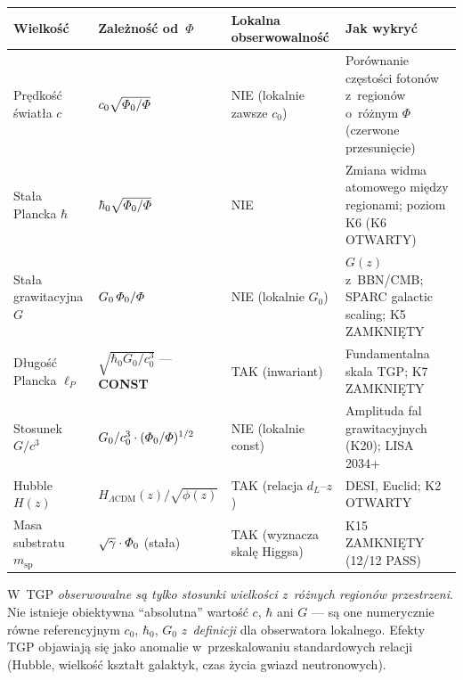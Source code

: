 \begin{center}
\small
\begin{tabular}{@{}p{3.2cm}p{2.8cm}p{2.5cm}p{5.5cm}@{}}
\toprule
\textbf{Wielko\'s\'c} & \textbf{Zale\.zno\'s\'c od~$\Phi$}
  & \textbf{Lokalna obserwowalno\'s\'c}
  & \textbf{Jak wykry\'c} \\
\midrule
Pr\k{e}dko\'s\'c \'swiat\l{}a $c$
  & $c_0\sqrt{\varPhi_0/\varPhi}$
  & NIE (lokalnie zawsze $c_0$)
  & Por\'ownanie cz\k{e}sto\'sci foton\'ow z~region\'ow
    o~r\'o\.znym $\Phi$ (czerwone przesuni\k{e}cie) \\
\midrule
Sta\l{}a Plancka $\hbar$
  & $\hbar_0\sqrt{\varPhi_0/\varPhi}$
  & NIE
  & Zmiana widma atomowego mi\k{e}dzy regionami;
    poziom K6 (K6 OTWARTY) \\
\midrule
Sta\l{}a grawitacyjna $G$
  & $G_0\,\varPhi_0/\varPhi$
  & NIE (lokalnie $G_0$)
  & $G(z)$ z~BBN/CMB; SPARC galactic scaling; K5 ZAMKNI\k{E}TY \\
\midrule
D\l{}ugo\'s\'c Plancka $\ell_P$
  & $\sqrt{\hbar_0 G_0/c_0^3}$ --- \textbf{CONST}
  & TAK (inwariant)
  & Fundamentalna skala TGP; K7 ZAMKNI\k{E}TY \\
\midrule
Stosunek $G/c^3$
  & $G_0/c_0^3 \cdot (\varPhi_0/\varPhi)^{1/2}$
  & NIE (lokalnie const)
  & Amplituda fal grawitacyjnych (K20); LISA 2034+ \\
\midrule
Hubble $H(z)$
  & $H_{\Lambda\mathrm{CDM}}(z)/\sqrt{\phi(z)}$
  & TAK (relacja $d_L$--$z$)
  & DESI, Euclid; K2 OTWARTY \\
\midrule
Masa substratu $m_{\mathrm{sp}}$
  & $\sqrt\gamma \cdot \varPhi_0$ (sta\l{}a)
  & TAK (wyznacza skal\k{e} Higgsa)
  & K15 ZAMKNI\k{E}TY (12/12 PASS) \\
\bottomrule
\end{tabular}
\end{center}

\begin{remark}\label{rem:relacyjna}
  W~TGP \emph{obserwowalne s\k{a} tylko stosunki wielko\'sci z~r\'o\.znych
  region\'ow przestrzeni}.
  Nie istnieje obiektywna ``absolutna'' warto\'s\'c $c$, $\hbar$ ani $G$
  --- s\k{a} one numerycznie r\'owne referencyjnym $c_0$, $\hbar_0$, $G_0$
  \emph{z~definicji} dla obserwatora lokalnego. Efekty TGP objawiaj\k{a}
  si\k{e} jako anomalie w~przeskalowaniu standardowych relacji
  (Hubble, wielko\'s\'c kszta\l{}t galaktyk, czas \.zycia gwiazd neutronowych).
\end{remark}

